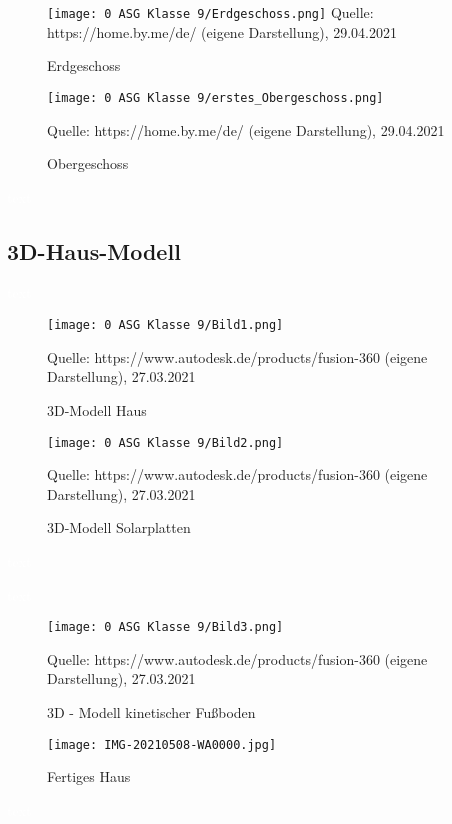 \begin{figure}[htbp!]
\begin{center}
\texttt{[image: 0 ASG Klasse 9/Erdgeschoss.png]}
\tiny{Quelle: https://home.by.me/de/ (eigene Darstellung), 29.04.2021}
\par
\caption{Erdgeschoss}
\end{center}
\end{figure}

\begin{figure}[t]
\begin{center}
\texttt{[image: 0 ASG Klasse 9/erstes\_Obergeschoss.png]}
\par
\tiny{Quelle: https://home.by.me/de/ (eigene Darstellung), 29.04.2021}
\par
\caption{Obergeschoss}
\end{center}
\end{figure}

\textcolor{white}{text}
\newpage

\subsection{3D-Haus-Modell}
\textcolor{white}{text}
\begin{figure}[htbp!]
\begin{center}
\texttt{[image: 0 ASG Klasse 9/Bild1.png]}
\par
\tiny{Quelle: https://www.autodesk.de/products/fusion-360 (eigene Darstellung), 27.03.2021}
\caption{3D-Modell Haus}
\end{center}
\end{figure}

\begin{figure}[h]
\begin{center}
\texttt{[image: 0 ASG Klasse 9/Bild2.png]}
\par
\tiny{Quelle: https://www.autodesk.de/products/fusion-360 (eigene Darstellung), 27.03.2021}
\caption{3D-Modell Solarplatten}
\end{center}
\end{figure}


\textcolor{white}{text}
\par
\textcolor{white}{text}
\begin{figure}[htbp!]
\begin{center}
\texttt{[image: 0 ASG Klasse 9/Bild3.png]}
\par
\tiny{Quelle: https://www.autodesk.de/products/fusion-360 (eigene Darstellung), 27.03.2021}
\caption{3D - Modell kinetischer Fußboden}
\end{center}
\end{figure}
\newpage
\begin{figure}[htbp!]
\begin{center}
\texttt{[image: IMG-20210508-WA0000.jpg]}
\caption{Fertiges Haus}
\end{center}
\end{figure}
\newpage
\textcolor{white}{text}
\newpage
